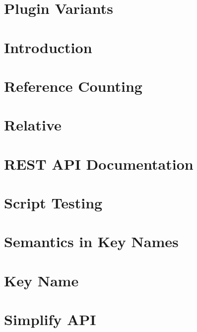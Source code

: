 \let\mypdfximage\pdfximage\def\pdfximage{\immediate\mypdfximage}\documentclass[twoside]{book}
\newcommand{\+}{\discretionary{\mbox{\scriptsize$\hookleftarrow$}}{}{}}
\begin{document}
\chapter{Plugin Variants}
\label{doc_decisions_plugin_variants_md}

\chapter{Introduction}
\label{doc_decisions_README_md}

\chapter{Reference Counting}
\label{doc_decisions_reference_counting_md}

\chapter{Relative}
\label{doc_decisions_relative_md}

\chapter{REST API Documentation}
\label{doc_decisions_rest_api_documentation_md}

\chapter{Script Testing}
\label{doc_decisions_script_testing_md}

\chapter{Semantics in Key Names}
\label{doc_decisions_semantics_name_md}

\chapter{Key Name}
\label{doc_decisions_separate_key_name_md}

\chapter{Simplify API}
\label{doc_decisions_simplify_api_md}

\end{document}
